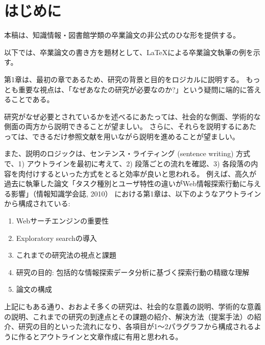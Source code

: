 \chapter{はじめに}
\label{chap:chapter1}

本稿は、知識情報・図書館学類の卒業論文の非公式のひな形を提供する。

以下では、卒業論文の書き方を題材として、\LaTeX による卒業論文執筆の例を示す。

第1章は、最初の章であるため、研究の背景と目的をロジカルに説明する。
もっとも重要な視点は、「なぜあなたの研究が必要なのか?」という疑問に端的に答えることである\cite{sakai:2015:korekara}。

研究がなぜ必要とされているかを述べるにあたっては、社会的な側面、学術的な側面の両方から説明できることが望ましい。
さらに、それらを説明するにあたっては、できるだけ参照文献を用いながら説明を進めることが望ましい。

また、説明のロジックは、センテンス・ライティング (sentence writing) 方式で、1) アウトラインを最初に考えて、2) 段落ごとの流れを確認、3) 各段落の内容を肉付けするといった方式をとると効率が良いと思われる。
例えば、高久が過去に執筆した論文「タスク種別とユーザ特性の違いがWeb情報探索行動に与える影響」（情報知識学会誌, 2010）\cite{takaku:2010:jsik} における第1章は、以下のようなアウトラインから構成されている:

\begin{enumerate}
    \item Webサーチエンジンの重要性
    \item Exploratory searchの導入
    \item これまでの研究法の視点と課題
    \item 研究の目的: 包括的な情報探索データ分析に基づく探索行動の精緻な理解
    \item 論文の構成
\end{enumerate}

上記にもある通り、おおよそ多くの研究は、社会的な意義の説明、学術的な意義の説明、これまでの研究の到達点とその課題の紹介、解決方法（提案手法）の紹介、研究の目的といった流れになり、各項目が1～2パラグラフから構成されるように作るとアウトラインと文章作成に有用と思われる。
